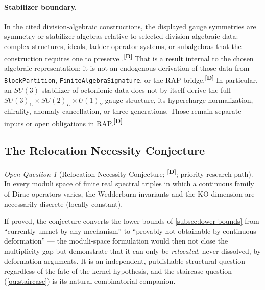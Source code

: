 \documentclass[12pt,a4paper,twoside]{article}
\theoremstyle{plain}
\theoremstyle{definition}
\theoremstyle{remark}
\newtheorem{openquestion}{Open Question}
\newcommand{\catmark}[1]{\textsuperscript{\textsf{\textbf{[#1]}}}}
\begin{document}
\paragraph{Stabilizer boundary.}
In the cited division-algebraic constructions, the displayed gauge
symmetries are symmetry or stabilizer algebras relative to selected
division-algebraic data: complex structures, ideals, ladder-operator
systems, or subalgebras that the construction requires one to preserve
\cite{furey2018,fureyhughes2022,furey2025}.\catmark{B}
That is a result internal to the chosen algebraic representation; it is
not an endogenous derivation of those data from
\texttt{BlockPartition}, \texttt{FiniteAlgebraSignature}, or the RAP
bridge.\catmark{D}
In particular, an $SU(3)$ stabilizer of octonionic data does not by itself
derive the full $SU(3)_C\times SU(2)_L\times U(1)_Y$ gauge structure,
its hypercharge normalization, chirality, anomaly cancellation, or three
generations. Those remain separate inputs or open obligations in RAP.\catmark{D}

\subsection{The Relocation Necessity Conjecture}
\label{subsec:rnc}

\begin{openquestion}[Relocation Necessity Conjecture; \catmark{D};
priority research path]
\label{oq:rnc}
In every moduli space of finite real spectral triples in which a
continuous family of Dirac operators varies, the Wedderburn invariants
and the KO-dimension are necessarily discrete (locally constant).
\end{openquestion}

If proved, the conjecture converts the lower bounds of
\cref{subsec:lower-bounds} from ``currently unmet by any mechanism'' to
``provably not obtainable by continuous deformation'' --- the moduli-space
formulation would then not close the multiplicity gap but demonstrate
that it can only be \emph{relocated}, never dissolved, by deformation
arguments. It is an independent, publishable structural question
regardless of the fate of the kernel hypothesis, and the staircase
question (\cref{oq:staircase}) is its natural combinatorial companion.

\end{document}
